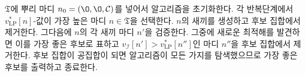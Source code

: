 \documentclass[11pt]{article} %
\newif\ifen
\theoremstyle{definition}
\theoremstyle{definition}
\begin{document}
\ifen
The algorithm is initialized by populating $\mathfrak{T}$ with the root node $n_0 = (\O, \O, \mathcal{C})$. At each iteration, it selects the node $n \in \mathfrak{T}$ having the highest $v_{\mathrm{LP}}^*[n]$-value, generates its children, and removes $n$ from the candidate set. Next, the children $n'$ of $n$ are inspected; if one of them yields a new optimal solution, then we mark it as the best candidate and fathom any nodes $n''$ for which  $v_{\mathcal{I}}[n'] >  v_{\mathrm{LP}}^*[n'']$. When no nodes remain in the candidate set, the algorithm has explored every branch, so it returns the best candidate and terminates.
\else
$\mathfrak{T}$에 뿌리 마디 $n_0 = (\O, \O, \mathcal{C})$를 넣어서 알고리즘을 초기화한다. 각 반복단계에서 $v_{\mathrm{LP}}^*[n]$-값이 가장 높은 마디 $n \in \mathfrak{T}$을 선택한다. $n$의 새끼를 생성하고 후보 집합에서 제거한다. 그다음에 $n$의 각 새끼 마디 $n'$을 검증한다. 그중에 새로운 최적해를 발견하면 이를 가장 좋은 후보로 표하고  $v_{\mathcal{I}}[n'] >  v_{\mathrm{LP}}^*[n'']$인 마디 $n''$을 후보 집합에서 제거한다. 후보 집합이 공집합이 되면 알고리즘이 모든 가지를 탐색했으므로 가장 좋은 후보를 출력하고 종료한다.
\fi
\end{document}
